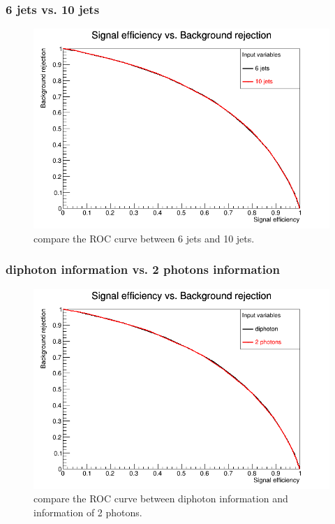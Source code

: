 \documentclass{beamer}
\begin{document}
\begin{frame}
\frametitle{6 jets vs. 10 jets }
\begin{figure}
\includegraphics[scale=0.25]{./figures/ROC_Curve_jets.png}
\caption{compare the ROC curve between 6 jets and 10 jets.}
\end{figure}
\end{frame}

\begin{frame}
\frametitle{diphoton information vs. 2 photons information }
\begin{figure}
\includegraphics[scale=0.25]{./figures/ROC_Curve_photon.png}
\caption{compare the ROC curve between diphoton information and information of 2 photons.}
\end{figure}
\end{frame}
\end{document}
